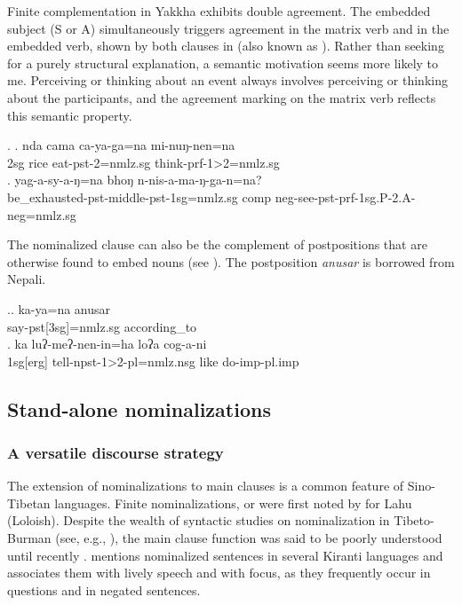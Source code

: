 Finite complementation in Yakkha exhibits double agreement. The embedded subject (S or A) simultaneously triggers agreement in the matrix verb and in the embedded verb, shown by both clauses in \Next (also known as ). Rather than seeking for a purely structural explanation, a semantic motivation seems more likely to me. Perceiving or thinking about an event always involves perceiving or thinking about the participants, and the agreement marking on the matrix verb reflects this semantic property.


\ex. \ag. nda cama ca-ya-ga=na mi-nuŋ-nen=na\\
{\sc 2sg} rice eat-{\sc pst-2=nmlz.sg} think-{\sc prf-1>2=nmlz.sg}\\
\bg. yag-a-sy-a-ŋ=na bhoŋ n-nis-a-ma-ŋ-ga-n=na?\\
be\_exhausted{\sc -pst-middle-pst-1sg=nmlz.sg} comp {\sc neg}-see-{\sc pst-prf-1sg.P-2.A-neg=nmlz.sg}\\

		
The nominalized clause can also be the complement of postpositions that are otherwise found to embed nouns (see \Next). The postposition \emph{anusar} is borrowed from Nepali.

\ex.\ag. ka-ya=na anusar\\
	say{\sc -pst[3sg]=nmlz.sg} according\_to\\
\bg. ka       luʔ-meʔ-nen-in=ha      loʔa cog-a-ni\\
{\sc 1sg[erg]} tell{\sc -npst-1>2-pl=nmlz.nsg} like  do{\sc -imp-pl.imp}\\


\subsection{Stand-alone nominalizations}\label{nmlz-uni-3}
\subsubsection{A versatile discourse strategy}

The extension of nominalizations to main clauses is a common feature of Sino-Tibetan languages. Finite nominalizations, or  were first noted by \citet{Matisoff1972Lahu} for Lahu (Loloish). Despite the wealth of syntactic studies on nominalization in Tibeto-Burman (see, e.g., \citealt{Matisoff1972Lahu, Noonan1997Versatile, Noonan2008_Nominalization, DeLancey1999Relativization, DeLancey2002_Relativization, Genetti1992Semantic, Doornenbal2008_Nominalization, Genettietal2008_Nominalization, Watters2008_Nominalization, DeLancey2011_Finite}), the main clause function was said to be poorly understood until recently \citep[101]{Genettietal2008_Nominalization}. \citet[110]{Ebert1994The-structure} mentions nominalized sentences in several Kiranti languages and associates them with lively speech and with  focus, as they frequently occur  in questions and in negated sentences.

